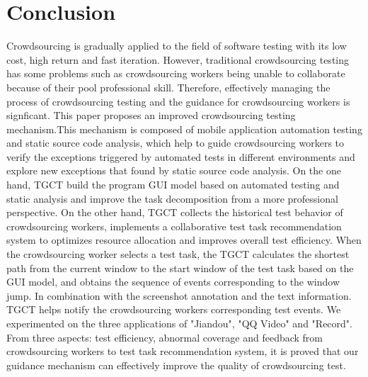 \section{Conclusion}
Crowdsourcing is gradually applied to the field of software testing with its low cost, high return and fast iteration. However, traditional crowdsourcing testing has some problems such as crowdsourcing workers being unable to collaborate because of their pool professional skill. Therefore, effectively managing the process of crowdsourcing testing and the guidance for crowdsourcing workers is signficant.
This paper proposes an improved crowdsourcing testing mechanism.This mechanism is composed of mobile application automation testing and static source code analysis, which help to guide crowdsourcing workers to verify the exceptions triggered by automated tests in different environments and explore new exceptions that found by static source code analysis. On the one hand, TGCT build the program GUI model based on automated testing and static analysis and improve the task decomposition from a more professional perspective. On the other hand, TGCT collects the historical test behavior of crowdsourcing workers, implements a collaborative test task recommendation system to optimizes resource allocation and improves overall test efficiency. When the crowdsourcing worker selects a test task, the TGCT calculates the shortest path from the current window to the start window of the test task based on the GUI model, and obtains the sequence of events corresponding to the window jump. In combination with the screenshot annotation and the text information. TGCT helps notify the crowdsourcing workers corresponding test events. We experimented on the three applications of "Jiandou", "QQ Video" and "Record".
From three aspects: test efficiency, abnormal coverage and feedback from crowdsourcing workers to test task recommendation system, it is proved that our guidance mechanism can effectively improve the quality of crowdsourcing test.